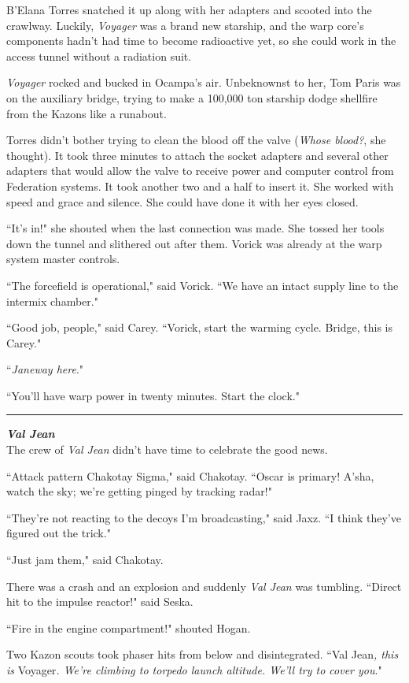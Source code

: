 \documentclass[twoside,letterpaper,12pt]{memoir}
\begin{document}
B'Elana Torres snatched it up along with her adapters and scooted into the crawlway. Luckily, \textit{Voyager} was a brand new starship, and the warp core's components hadn't had time to become radioactive yet, so she could work in the access tunnel without a radiation suit.

\textit{Voyager} rocked and bucked in Ocampa's air. Unbeknownst to her, Tom Paris was on the auxiliary bridge, trying to make a 100,000 ton starship dodge shellfire from the Kazons like a runabout.

Torres didn't bother trying to clean the blood off the valve (\textit{Whose blood?}, she thought). It took three minutes to attach the socket adapters and several other adapters that would allow the valve to receive power and computer control from Federation systems. It took another two and a half to insert it. She worked with speed and grace and silence. She could have done it with her eyes closed.

``It's in!" she shouted when the last connection was made. She tossed her tools down the tunnel and slithered out after them. Vorick was already at the warp system master controls.

``The forcefield is operational," said Vorick. ``We have an intact supply line to the intermix chamber."

``Good job, people," said Carey. ``Vorick, start the warming cycle. Bridge, this is Carey."

``\textit{Janeway here}."

``You'll have warp power in twenty minutes. Start the clock."

\fancybreak{\rule{3cm}{0.4 pt}}
\noindent\textit{\textbf{Val Jean}}\\

The crew of \textit{Val Jean} didn't have time to celebrate the good news.

``Attack pattern Chakotay Sigma," said Chakotay. ``Oscar is primary! A'sha, watch the sky; we're getting pinged by tracking radar!"

``They're not reacting to the decoys I'm broadcasting," said Jaxz. ``I think they've figured out the trick."

``Just jam them," said Chakotay.

There was a crash and an explosion and suddenly \textit{Val Jean} was tumbling. ``Direct hit to the impulse reactor!" said Seska.

``Fire in the engine compartment!" shouted Hogan.

Two Kazon scouts took phaser hits from below and disintegrated. ``Val Jean\textit{, this is }Voyager\textit{. We're climbing to torpedo launch altitude. We'll try to cover you}."
\end{document}
